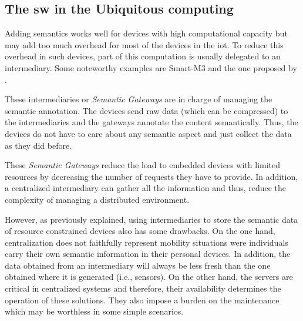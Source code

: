 \subsection{The \acl{sw} in the Ubiquitous computing}




Adding semantics works well for devices with high computational capacity but may add too much overhead for most of the devices in the \ac{iot}.
To reduce this overhead in such devices, part of this computation is usually delegated to an intermediary.
Some noteworthy examples are Smart-M3 \citep{honkola_smart-m3_2010} and the one proposed by \citet{broring_semantic_2009}.

These intermediaries or \emph{Semantic Gateways} are in charge of managing the semantic annotation.
The devices send raw data (which can be compressed) to the intermediaries and the gateways annotate the content semantically.
Thus, the devices do not have to care about any semantic aspect and just collect the data as they did before.

These \emph{Semantic Gateways} reduce the load to embedded devices with limited resources by decreasing the number of requests they have to provide.
In addition, a centralized intermediary can gather all the information and thus, reduce the complexity of managing a distributed environment.

However, as previously explained, using intermediaries to store the semantic data of resource constrained devices also has some drawbacks.
On the one hand, centralization does not faithfully represent mobility situations were individuals carry their own semantic information in their personal devices.
In addition, the data obtained from an intermediary will always be less fresh than the one obtained where it is generated (i.e., sensors).
On the other hand, the servers are critical in centralized systems and therefore, their availability determines the operation of these solutions.
They also impose a burden on the maintenance which may be worthless in some simple scenarios.


